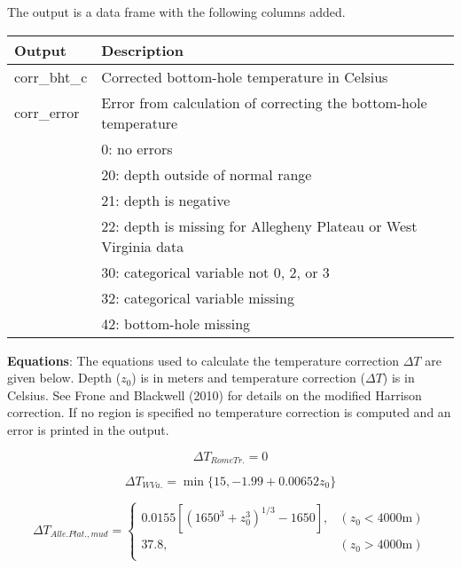 \documentclass[12pt,a4paper]{article}
\begin{document}
The output is a data frame with the following columns added.

\begin{table}[H]
\begin{tabular} {p{2cm} p{11cm}}
\hline
\textbf{Output} & \textbf{Description}\\
\hline
\textsf{corr\_bht\_c} 	 & Corrected bottom-hole temperature in Celsius \\
\textsf{corr\_error}		 & Error from calculation of correcting the bottom-hole temperature\\
  & 0: no errors\\
  & 20: depth outside of normal range\\
  & 21: depth is negative\\
  & 22: depth is missing for Allegheny Plateau or West Virginia data\\
  & 30: categorical variable not 0, 2, or 3\\
  & 32: categorical variable missing\\
  & 42: bottom-hole missing\\
\hline
\end{tabular} 
\end{table}

\textbf{Equations}: The equations used to calculate the temperature correction $\Delta T$ are given below. Depth ($z_0$) is in meters and temperature correction ($\Delta T$) is in Celsius. See Frone and Blackwell (2010) for details on the modified Harrison correction. If no region is specified no temperature correction is computed and an error is printed in the output.


\begin{equation} \label{DT_rt}
{\Delta T}_{Rome Tr.} = 0
\end{equation}

\begin{equation} \label{DT_wv}
{\Delta T}_{W Va.} = \min\{15, -1.99 + 0.00652z_0 \}
\end{equation}

\begin{equation} \label{AP_mud}
{\Delta T}_{Alle. Plat., mud} =  \left\{
\begin{array}{ll}
0.0155\left[ \left(1650^3 + z_0^3\right)^{1/3} - 1650 \right],	& (z_0 < 4000 \mathrm{m})\\
37.8,  & (z_0 > 4000 \mathrm{m})\\
\end{array} \right .
\end{equation}
\end{document}
